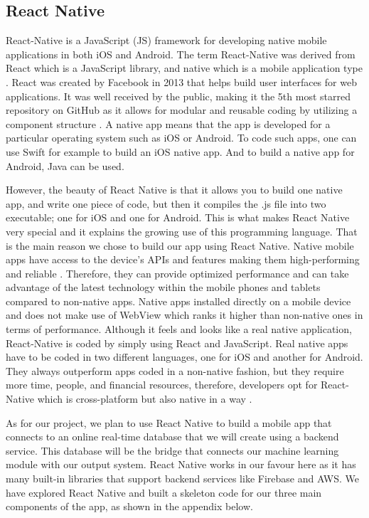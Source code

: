 \documentclass{article}
\begin{document}
\subsection{React Native}
React-Native is a JavaScript (JS) framework for developing native mobile applications in both iOS and Android. The term React-Native was derived from React which is a JavaScript library, and native
which is a mobile application type \cite{reactNative}. React was created by Facebook in 2013 that helps build user interfaces for web applications. It was well received by the public, making it the 5th most
starred repository on GitHub as it allows for modular and reusable coding by utilizing a component structure \cite{reactNative}. A native app means that the app is developed for a particular operating system such as iOS or Android. To code such apps, one can use Swift for example to build an iOS native app. And to build a native app for Android, Java can be used.\pagebreak

However, the beauty of React Native is that it allows you to build one native app, and write one piece of code, but then it compiles the .js file into two executable; one for iOS and one for Android. This is what makes React Native very special and it explains the growing use of this programming language. That is the main reason we chose to build our app using React Native. Native mobile apps have access to the device’s APIs and features making them high-performing and reliable \cite{reactNative}. Therefore, they can provide optimized performance and can take advantage of the latest technology within the mobile phones and tablets compared to non-native apps. Native apps installed directly on a mobile device and does not make use of WebView which ranks it higher than non-native ones in terms of performance. Although it feels and looks like a real native application, React-Native is coded by simply using React and JavaScript. Real native apps have to be coded in two different languages, one for iOS and another for Android. They always outperform apps coded in a non-native fashion, but they require more time, people, and financial resources, therefore, developers opt for React-Native which is cross-platform but also native in a way \cite{reactNative}. \newline

As for our project, we plan to use React Native to build a mobile app that connects to an online real-time database that we will create using a backend service. This database will be the bridge that connects our machine learning module with our output system. React Native works in our favour here as it has many built-in libraries that support backend services like Firebase and AWS. We have explored React Native and built a skeleton code for our three main components of the app, as shown in the appendix below.\pagebreak
\end{document}

